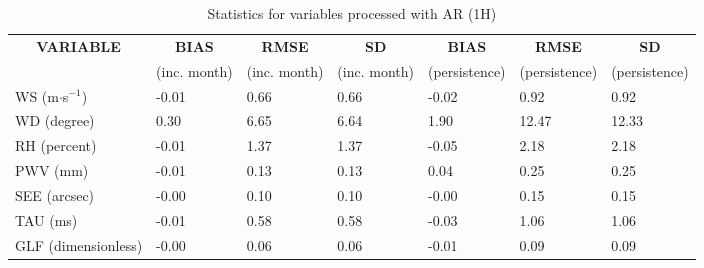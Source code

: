 \documentclass[11pt,english]{article}
\begin{document}
\begin{table}[]
\begin{center}
\begin{tabular}{|l|l|l|l|l|l|l|}
\hline
\multicolumn{1}{|c|}{\cellcolor[HTML]{C0C0C0}\textbf{VARIABLE}} & \multicolumn{1}{c|}{\cellcolor[HTML]{C0C0C0}\textbf{BIAS}} & \multicolumn{1}{c|}{\cellcolor[HTML]{C0C0C0}\textbf{RMSE}} & \multicolumn{1}{c|}{\cellcolor[HTML]{C0C0C0}\textbf{SD}} & \multicolumn{1}{c|}{\cellcolor[HTML]{C0C0C0}\textbf{BIAS}} & \multicolumn{1}{c|}{\cellcolor[HTML]{C0C0C0}\textbf{RMSE}} & \multicolumn{1}{c|}{\cellcolor[HTML]{C0C0C0}\textbf{SD}}\\
\multicolumn{1}{|c|}{\cellcolor[HTML]{C0C0C0}} & \multicolumn{1}{c|}{\cellcolor[HTML]{C0C0C0}(inc. month)} & \multicolumn{1}{c|}{\cellcolor[HTML]{C0C0C0}(inc. month)} & \multicolumn{1}{c|}{\cellcolor[HTML]{C0C0C0}(inc. month)} & \multicolumn{1}{c|}{\cellcolor[HTML]{C0C0C0}(persistence)} & \multicolumn{1}{c|}{\cellcolor[HTML]{C0C0C0}(persistence)} & \multicolumn{1}{c|}{\cellcolor[HTML]{C0C0C0}(persistence)}\\\hline
\cellcolor[HTML]{C0C0C0}WS (m$\cdot$s$^{-1}$) &     -0.01  &      0.66  &      0.66  &     -0.02  &      0.92  &      0.92\\
\cellcolor[HTML]{C0C0C0}WD (degree)           &      0.30  &      6.65  &      6.64  &      1.90  &     12.47  &     12.33\\
\cellcolor[HTML]{C0C0C0}RH (percent)          &     -0.01  &      1.37  &      1.37  &     -0.05  &      2.18  &      2.18\\
\cellcolor[HTML]{C0C0C0}PWV (mm)              &     -0.01 &      0.13 &      0.13 &      0.04 &      0.25 &      0.25\\
\cellcolor[HTML]{C0C0C0}SEE (arcsec)          &     -0.00 &      0.10 &      0.10 &     -0.00 &      0.15 &      0.15\\
\cellcolor[HTML]{C0C0C0}TAU (ms)              &     -0.01 &      0.58 &      0.58 &     -0.03 &      1.06 &      1.06\\
\cellcolor[HTML]{C0C0C0}GLF (dimensionless)   &     -0.00 &      0.06 &      0.06 &     -0.01 &      0.09 &      0.09\\
\hline
\end{tabular}
\caption{Statistics for variables processed with AR (1H)}
\end{center}
\end{table}


\newpage
\end{document}

